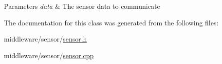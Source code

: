 \begin{DoxyParams}{Parameters}
{\em data} & The sensor data to communicate \\
\hline
\end{DoxyParams}


The documentation for this class was generated from the following files:\begin{DoxyCompactItemize}
\item 
middleware/sensor/\hyperlink{sensor_8h}{sensor.h}\item 
middleware/sensor/\hyperlink{sensor_8cpp}{sensor.cpp}\end{DoxyCompactItemize}

